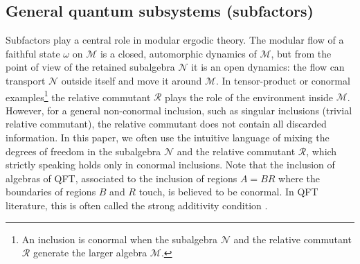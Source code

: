 \documentclass[a4paper,11pt]{article}
\theoremstyle{definition}
\newcommand{\mR}{\mathcal{R}}
\newcommand{\mN}{\mathcal{N}}
\newcommand{\mM}{\mathcal{M}}
\begin{document}
\subsection{General quantum subsystems (subfactors)}
\label{subsec:quantum-coarse}

Subfactors play a central role in modular ergodic theory. The modular flow of a faithful state $\omega$ on $\mM$ is a closed, automorphic dynamics of $\mM$, but from the point of view of the retained subalgebra $\mN$ it is an open dynamics: the flow can transport $\mN$ outside itself and move it around $\mM$. In tensor-product or conormal examples\footnote{An inclusion is conormal when the subalgebra $\mN$ and the relative commutant $\mR$ generate the larger algebra $\mM$.} the relative commutant $\mR$ plays the role of the environment inside $\mM$. However, for a general non-conormal inclusion, such as singular inclusions (trivial relative commutant), the relative commutant does not contain all discarded information. In this paper, we often use the intuitive language of mixing the degrees of freedom in the subalgebra $\mN$ and the relative commutant $\mR$, which strictly speaking holds only in conormal inclusions. Note that the inclusion of algebras of QFT, associated to the inclusion of regions $A=BR$ where the boundaries of regions $B$ and $R$ touch, is believed to be conormal. In QFT literature, this is often called the strong additivity condition \cite{Wiesbrock1993b,Guido1998}.
\end{document}
